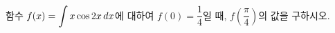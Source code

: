 함수 $f(x)=\displaystyle\int x\cos 2x\mkern3mu dx$에 대하여 $f(0)=\dfrac{1}{4}$일 때, $f\left(\dfrac{\pi}{4}\right)$의 값을 구하시오.
